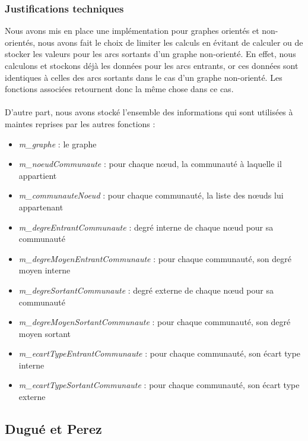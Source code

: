 \begin{titlepage}
{\subsubsection{Justifications techniques}
{
Nous avons mis en place une implémentation pour graphes orientés et non-orientés, nous avons fait le choix de limiter les calculs en évitant de calculer ou de stocker les valeurs pour les arcs sortants d'un graphe non-orienté. En effet, nous calculons et stockons déjà les données pour les arcs entrants, or ces données sont identiques à celles des arcs sortants dans le cas d'un graphe non-orienté. Les fonctions associées retournent donc la même chose dans ce cas.
\\ \\
D'autre part, nous avons stocké l'ensemble des informations qui sont utilisées à maintes reprises par les autres fonctions :}
\begin{itemize}
    \item \textit{m\_graphe} : le graphe
    \item \textit{m\_noeudCommunaute} : pour chaque nœud, la communauté à laquelle il appartient
    \item \textit{m\_communauteNoeud} : pour chaque communauté, la liste des nœuds lui appartenant
    \item \textit{m\_degreEntrantCommunaute} : degré interne de chaque nœud pour sa communauté
    \item \textit{m\_degreMoyenEntrantCommunaute} : pour chaque communauté, son degré moyen interne
    \item \textit{m\_degreSortantCommunaute} : degré externe de chaque nœud pour sa communauté
    \item \textit{m\_degreMoyenSortantCommunaute} : pour chaque communauté, son degré moyen sortant
    \item \textit{m\_ecartTypeEntrantCommunaute} : pour chaque communauté, son écart type interne
    \item \textit{m\_ecartTypeSortantCommunaute} : pour chaque communauté, son écart type externe
\end{itemize}

\subsection{Dugué et Perez}
}
\end{titlepage}
